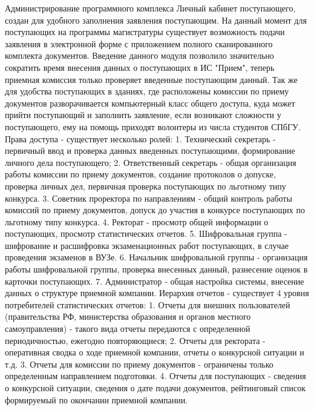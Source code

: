 \documentclass[12pt]{article}
\begin{document}
              Администрирование программного комплекса
              Личный кабинет поступающего, создан для удобного заполнения заявления поступающим. На данный момент для поступающих на программы магистратуры существует возможность подачи заявления в электронной форме с приложением полного сканированного комплекта документов. Введение данного модуля позволило значительно сократить время внесения данных о поступающих в ИС "Прием", теперь приемная комиссия только проверяет введенные поступающим данный. Так же для удобства поступающих в зданиях, где расположены комиссии по приему документов разворачивается компьютерный класс общего доступа, куда может прийти поступающий и заполнить заявление, если возникают сложности у поступающего, ему на помощь приходят волонтеры из числа студентов СПбГУ.
              Права доступа - существует несколько ролей:
              1. Технический секретарь - первичный ввод и проверка данных введенных поступающими, формирование личного дела поступающего;
              2. Ответственный секретарь - общая организация работы комиссии по приему документов, создание протоколов о допуске, проверка личных дел, первичная проверка поступающих по льготному типу конкурса.
              3. Советник проректора по направлениям - общий контроль работы комиссий по приему документов, допуск до участия в конкурсе поступающих по льготному типу конкурса.
              4. Ректорат - просмотр общей информации о поступающих, просмотр статистических отчетов.
              5. Шифровальная группа - шифрование и расшифровка экзаменационных работ поступающих, в случае проведения экзаменов в ВУЗе.
              6. Начальник шифровальной группы - организация работы шифровальной группы, проверка внесенных данный, разнесение оценок в карточки поступающих.
              7. Администратор - общая настройка системы, внесение данных о структуре приемной компании.
              Иерархия отчетов - существует 4 уровня потребителей статистических отчетов:
              1. Отчеты для внешних пользователей (правительства РФ, министерства образования и органов местного самоуправления) - такого вида отчеты передаются с определенной периодичностью, ежегодно повторяющиеся;
              2. Отчеты для ректората - оперативная сводка о ходе приемной компании, отчеты о конкурсной ситуации и т.д.
              3. Отчеты для комиссии по приему документов - ограничены только определенным направлением подготовки.
              4. Отчеты для поступающих - сведения о конкурсной ситуации, сведения о дате подачи документов, рейтинговый список формируемый по окончании приемной компании.
\end{document}
